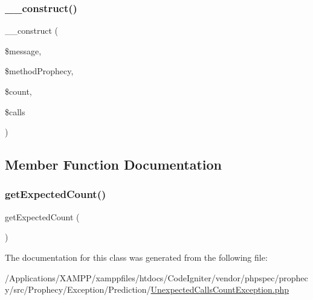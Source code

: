 \subsubsection{\texorpdfstring{\+\_\+\+\_\+construct()}{\_\_construct()}}
{\footnotesize\ttfamily \+\_\+\+\_\+construct (\begin{DoxyParamCaption}\item[{}]{\$message,  }\item[{\mbox{\hyperlink{class_prophecy_1_1_prophecy_1_1_method_prophecy}{Method\+Prophecy}}}]{\$method\+Prophecy,  }\item[{}]{\$count,  }\item[{array}]{\$calls }\end{DoxyParamCaption})}



\subsection{Member Function Documentation}
\mbox{\label{class_prophecy_1_1_exception_1_1_prediction_1_1_unexpected_calls_count_exception_a480984c2b94e84a20ecb8628a3396fbb}} 
\subsubsection{\texorpdfstring{get\+Expected\+Count()}{getExpectedCount()}}
{\footnotesize\ttfamily get\+Expected\+Count (\begin{DoxyParamCaption}{ }\end{DoxyParamCaption})}



The documentation for this class was generated from the following file\+:\begin{DoxyCompactItemize}
\item 
/\+Applications/\+X\+A\+M\+P\+P/xamppfiles/htdocs/\+Code\+Igniter/vendor/phpspec/prophecy/src/\+Prophecy/\+Exception/\+Prediction/\mbox{\hyperlink{_unexpected_calls_count_exception_8php}{Unexpected\+Calls\+Count\+Exception.\+php}}\end{DoxyCompactItemize}
